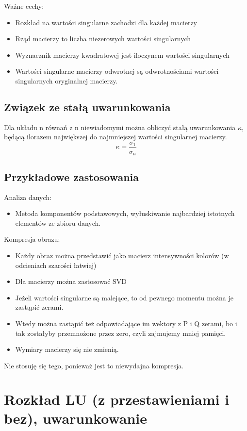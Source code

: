 \documentclass[a4paper]{article}
\begin{document}
Ważne cechy:
\begin{itemize}
    \item Rozkład na wartości singularne zachodzi dla każdej macierzy
    \item Rząd macierzy to liczba niezerowych wartości singularnych
    \item Wyznacznik macierzy kwadratowej jest iloczynem wartości singularnych
    \item Wartości singularne macierzy odwrotnej są odwrotnościami wartości singularnych oryginalnej macierzy.
\end{itemize}

\subsection{Związek ze stałą uwarunkowania}
Dla układu n równań z n niewiadomymi można obliczyć stałą uwarunkowania $\kappa$, będącą ilorazem największej do najmniejszej wartości singularnej macierzy.
\begin{equation*}
    \kappa = \frac{\sigma_1}{\sigma_n}
\end{equation*}

\subsection{Przykładowe zastosowania}
Analiza danych:
\begin{itemize}
    \item Metoda komponentów podstawowych, wyłuskiwanie najbardziej istotnych elementów ze zbioru danych.
\end{itemize}

Kompresja obrazu:
\begin{itemize}
    \item Każdy obraz można przedstawić jako macierz intensywności kolorów (w odcieniach szarości łatwiej) 
    \item Dla macierzy można zastosować SVD 
    \item Jeżeli wartości singularne są malejące, to od pewnego momentu można je zastąpić zerami. 
    \item Wtedy można zastąpić też odpowiadające im wektory z P i Q zerami, bo i tak zostałyby przemnożone przez zero, czyli zajmujemy mniej pamięci. 
    \item Wymiary macierzy się nie zmienią.
\end{itemize}
Nie stosuję się tego, ponieważ jest to niewydajna kompresja.

\section{Rozkład LU (z przestawieniami i bez), uwarunkowanie}
\end{document}
